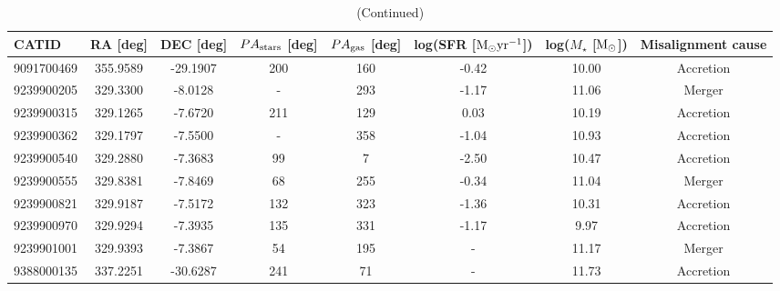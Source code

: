 \documentclass[fleqn,usenatbib]{mnras}
\begin{document}

\setlength{\tabcolsep}{9.0pt} %
\renewcommand{\arraystretch}{1.2}
\begin{table}
\centering
\caption{(Continued)}\label{tab:TableA5}

\begin{tabular*}{\linewidth}{cccccccc}
\hline
\multicolumn{1}{l}{CATID} & \multicolumn{1}{l}{RA [deg]} & \multicolumn{1}{l}{DEC [deg]} & \multicolumn{1}{l}{$PA_{\rm{stars}}$ [deg]} & \multicolumn{1}{l}{$PA_{\rm{gas}}$ [deg]} & \multicolumn{1}{l}{log(SFR [$\rm{M_{\odot}yr^{-1}}$])} & \multicolumn{1}{l}{log($M_{\star}$ [$\rm{M_{\odot}}$])} & \multicolumn{1}{l}{Misalignment cause} \\
\hline

9091700469                & 355.9589               & -29.1907                & 200                           & 160                         & -0.42%
& 10.00 %
& Accretion          \\
9239900205                & 329.3300               & -8.0128                 & -                             & 293                         & -1.17%
& 11.06%
& Merger             \\
9239900315                & 329.1265               & -7.6720                 & 211                           & 129                         & 0.03%
& 10.19%
& Accretion          \\
9239900362                & 329.1797               & -7.5500                 & -                             & 358                         & -1.04%
& 10.93%
& Accretion          \\
9239900540                & 329.2880               & -7.3683                 & 99                            & 7                           & -2.50%
& 10.47%
& Accretion          \\
9239900555                & 329.8381               & -7.8469                 & 68                            & 255                         & -0.34%
& 11.04%
& Merger             \\
9239900821                & 329.9187               & -7.5172                 & 132                           & 323                         & -1.36%
& 10.31%
& Accretion          \\
9239900970                & 329.9294               & -7.3935                 & 135                           & 331                         & -1.17%
& 9.97%
& Accretion          \\
9239901001                & 329.9393               & -7.3867                 & 54                            & 195                         & -                       & 11.17%
& Merger             \\
9388000135                & 337.2251               & -30.6287                & 241                           & 71                          & -                       & 11.73%
& Accretion         

\end{tabular*}
\end{table}



\bsp	%
\label{lastpage}
\end{document}
